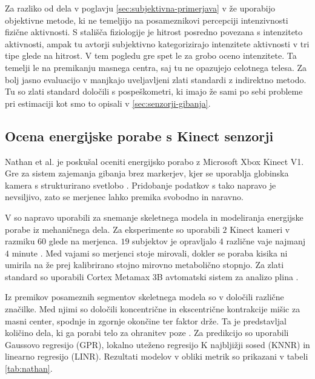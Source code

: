 Za razliko od dela v poglavju \ref{sec:subjektivna-primerjava} v \cite{silva2015assessing} že uporabijo objektivne metode, ki ne temeljijo na posameznikovi percepciji intenzivnosti fizične aktivnosti. S stališča fiziologije je hitrost posredno povezana s intenziteto aktivnosti, ampak tu avtorji subjektivno kategorizirajo intenzitete aktivnosti v tri tipe glede na hitrost. V tem pogledu gre spet le za grobo oceno intenzitete. Ta temelji le na premikanju masnega centra, saj tu ne opazujejo celotnega telesa. Za bolj jasno evaluacijo v \cite{silva2015assessing} manjkajo uveljavljeni zlati standardi z indirektno metodo. Tu so zlati standard določili s pospeškometri, ki imajo že sami po sebi probleme pri estimaciji kot smo to opisali v \ref{sec:senzorji-gibanja}.





\subsection{Ocena energijske porabe s Kinect senzorji}

Nathan et al. \cite{nathan2015estimating} je poskušal oceniti energijsko porabo z Microsoft Xbox Kinect V1. Gre za sistem zajemanja gibanja brez markerjev, kjer se uporablja globinska kamera s strukturirano svetlobo \cite{nathan2015estimating}. Pridobanje podatkov s tako napravo je nevsiljivo, zato se merjenec lahko premika svobodno in naravno. 

V \cite{nathan2015estimating} so napravo uporabili za snemanje skeletnega modela in modeliranja energijske porabe iz mehaničnega dela. Za eksperimente so uporabili $2$ Kinect kameri v razmiku \SI{60}{\stopinj} glede na merjenca. $19$ subjektov je opravljalo $4$ različne vaje najmanj $4$ minute \cite{nathan2015estimating}. Med vajami so merjenci stoje mirovali, dokler se poraba kisika ni umirila na že prej kalibrirano stojno mirovno metabolično stopnjo. Za zlati standard so uporabili Cortex Metamax 3B avtomatski sistem za analizo plina \cite{nathan2015estimating}.

Iz premikov posameznih segmentov skeletnega modela so v \cite{nathan2015estimating} določili različne značilke. Med njimi so določili koncentrične in ekscentrične kontrakcije mišic za masni center, spodnje in zgornje okončine ter faktor drže. Ta je predstavljal količino dela, ki ga porabi telo za ohranitev poze \cite{nathan2015estimating}. Za predikcijo so uporabili Gaussovo regresijo (GPR), lokalno uteženo regresijo K najbljižji sosed (KNNR) in linearno regresijo (LINR). Rezultati modelov v obliki metrik so prikazani v tabeli \ref{tab:nathan}.

